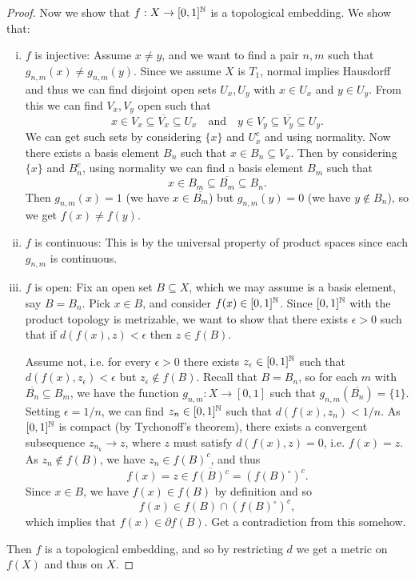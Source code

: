 \begin{proof}
  Now we show that $f : X \to [0, 1]^{\mathbb{N}}$ is a
  topological embedding. We show that:
  \begin{enumerate}[(i)]
    \item $f$ is injective: Assume
      $x \ne y$, and we want to find a pair $n, m$
      such that $g_{n, m}(x) \ne g_{n, m}(y)$.
      Since we assume $X$ is $T_1$, normal implies
      Hausdorff and thus
      we can find disjoint open sets $U_x, U_y$
      with $x \in U_x$ and $y \in U_y$. From this
      we can find $V_x, V_y$ open such that
      \[
        x \in V_x \subseteq \overline{V_x} \subseteq U_x
        \quad \text{and} \quad
        y \in V_y \subseteq \overline{V_y} \subseteq U_y.
      \]
      We can get such sets by considering
      $\{x\}$ and $U_x^c$ and using normality. Now
      there exists a basis element $B_n$ such that
      $x \in B_n \subseteq V_x$. Then by considering
      $\{x\}$ and $B_n^c$,  using normality we can
      find a basis element $B_m$ such that
      \[
        x \in B_m \subseteq \overline{B_m} \subseteq B_n.
      \]
      Then $g_{n, m}(x) = 1$ (we have
      $x \in \overline{B_m}$) but $g_{n, m}(y) = 0$
      (we have $y \notin B_n$),
      so we get $f(x) \ne f(y)$.
    \item $f$ is continuous: This is by the
      universal property of product spaces since
      each $g_{n, m}$ is continuous.
    \item $f$ is open: Fix an open set $B \subseteq X$,
      which we may assume is a basis
      element, say $B = B_n$. Pick $x \in B$, and
      consider
      $f(x) \in [0, 1]^{\mathbb{N}}$. Since $[0, 1]^{\mathbb{N}}$
      with the product topology is metrizable, we
      want to show that
      there exists $\epsilon > 0$ such that if
      $d(f(x), z) < \epsilon$ then $z \in f(B)$.

      Assume not, i.e. for every $\epsilon > 0$
      there exists $z_\epsilon \in [0, 1]^{\mathbb{N}}$
      such that $d(f(x), z_\epsilon) < \epsilon$
      but $z_\epsilon \notin f(B)$. Recall that
      $B = B_n$, so for each $m$ with
      $\overline{B_n} \subseteq B_m$, we have
      the function
      $g_{n, m} : X \to [0, 1]$ such that
      $g_{n, m}(\overline{B_n}) = \{1\}$. Setting
      $\epsilon = 1 / n$, we can find
      $z_n \in [0, 1]^{\mathbb{N}}$ such that
      $d(f(x), z_n) < 1 / n$. As $[0, 1]^{\mathbb{N}}$ is
      compact (by Tychonoff's theorem), there exists
      a convergent subsequence $z_{n_k} \to z$, where
      $z$ must satisfy $d(f(x), z) = 0$, i.e.
      $f(x) = z$.
      As $z_n \notin f(B)$, we have $z_n \in f(B)^c$,
      and thus
      \[
        f(x) = z \in \overline{f(B)^c}
        = (f(B)^\circ)^c.
      \]
      Since $x \in B$, we have
      $f(x) \in f(B)$ by definition and so
      \[
        f(x) \in f(B) \cap (f(B)^\circ)^c,
      \]
      which implies that $f(x) \in \partial f(B)$.
      Get a contradiction from this somehow.
  \end{enumerate}
  Then $f$ is a topological embedding, and so by
  restricting $d$
  we get a metric on $f(X)$ and thus on $X$.
\end{proof}

